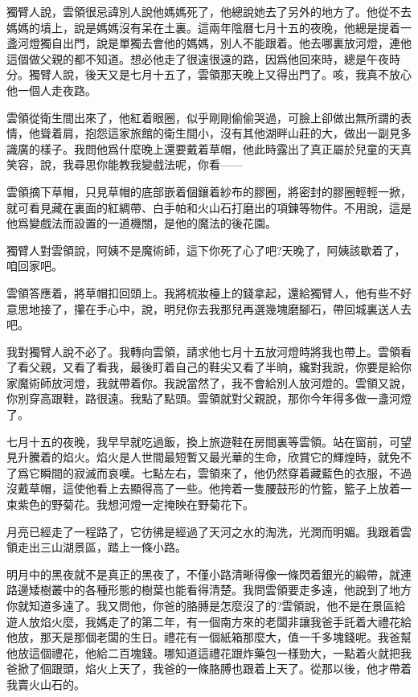 \documentclass[a6paper]{article}
\begin{document}
獨臂人說，雲領很忌諱別人說他媽媽死了，他總說她去了另外的地方了。他從不去媽媽的墳上，說是媽媽沒有呆在土裏。這兩年陰曆七月十五的夜晚，他總是提着一盞河燈獨自出門，說是單獨去會他的媽媽，別人不能跟着。他去哪裏放河燈，連他這個做父親的都不知道。想必他走了很遠很遠的路，因爲他回來時，總是午夜時分。獨臂人說，後天又是七月十五了，雲領那天晚上又得出門了。咳，我真不放心他一個人走夜路。

雲領從衛生間出來了，他紅着眼圈，似乎剛剛偷偷哭過，可臉上卻做出無所謂的表情，他聳着肩，抱怨這家旅館的衛生間小，沒有其他湖畔山莊的大，做出一副見多識廣的樣子。我問他爲什麼晚上還要戴着草帽，他此時露出了真正屬於兒童的天真笑容，說，我尋思你能教我變戲法呢，你看——

雲領摘下草帽，只見草帽的底部嵌着個鑲着紗布的膠圈，將密封的膠圈輕輕一掀，就可看見藏在裏面的紅綢帶、白手帕和火山石打磨出的項鍊等物件。不用說，這是他爲變戲法而設置的一道機關，是他的魔法的後花園。

獨臂人對雲領說，阿姨不是魔術師，這下你死了心了吧?天晚了，阿姨該歇着了，咱回家吧。

雲領答應着，將草帽扣回頭上。我將梳妝檯上的錢拿起，還給獨臂人，他有些不好意思地接了，攥在手心中，說，明兒你去我那兒再選幾塊磨腳石，帶回城裏送人去吧。

我對獨臂人說不必了。我轉向雲領，請求他七月十五放河燈時將我也帶上。雲領看了看父親，又看了看我，最後盯着自己的鞋尖又看了半晌，纔對我說，你要是給你家魔術師放河燈，我就帶着你。我說當然了，我不會給別人放河燈的。雲領又說，你別穿高跟鞋，路很遠。我點了點頭。雲領就對父親說，那你今年得多做一盞河燈了。

七月十五的夜晚，我早早就吃過飯，換上旅遊鞋在房間裏等雲領。站在窗前，可望見升騰着的焰火。焰火是人世間最短暫又最光華的生命，欣賞它的輝煌時，就免不了爲它瞬間的寂滅而哀嘆。七點左右，雲領來了，他仍然穿着藏藍色的衣服，不過沒戴草帽，這使他看上去顯得高了一些。他挎着一隻腰鼓形的竹籃，籃子上放着一束紫色的野菊花。我想河燈一定掩映在野菊花下。

月亮已經走了一程路了，它彷彿是經過了天河之水的淘洗，光潤而明媚。我跟着雲領走出三山湖景區，踏上一條小路。

明月中的黑夜就不是真正的黑夜了，不僅小路清晰得像一條閃着銀光的緞帶，就連路邊矮樹叢中的各種形態的樹葉也能看得清楚。我問雲領要走多遠，他說到了地方你就知道多遠了。我又問他，你爸的胳膊是怎麼沒了的?雲領說，他不是在景區給遊人放焰火麼，我媽走了的第二年，有一個南方來的老闆非讓我爸手託着大禮花給他放，那天是那個老闆的生日。禮花有一個紙箱那麼大，值一千多塊錢呢。我爸幫他放這個禮花，他給二百塊錢。哪知道這禮花跟炸藥包一樣勁大，一點着火就把我爸掀了個跟頭，焰火上天了，我爸的一條胳膊也跟着上天了。從那以後，他才帶着我賣火山石的。
\end{document}
